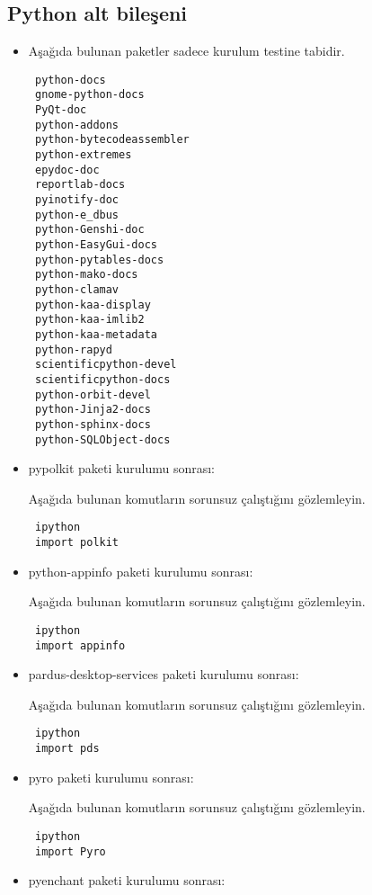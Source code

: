 \documentclass[a4paper,10pt]{article}
\begin{document}
\subsection{Python alt bileşeni}
\begin{itemize}

\item Aşağıda bulunan paketler sadece kurulum testine tabidir.
\begin{verbatim}
 python-docs
 gnome-python-docs
 PyQt-doc
 python-addons
 python-bytecodeassembler
 python-extremes
 epydoc-doc
 reportlab-docs
 pyinotify-doc 
 python-e_dbus
 python-Genshi-doc
 python-EasyGui-docs
 python-pytables-docs
 python-mako-docs
 python-clamav
 python-kaa-display
 python-kaa-imlib2
 python-kaa-metadata
 python-rapyd 
 scientificpython-devel
 scientificpython-docs
 python-orbit-devel
 python-Jinja2-docs
 python-sphinx-docs
 python-SQLObject-docs
\end{verbatim}
\item pypolkit paketi kurulumu sonrası:

Aşağıda bulunan komutların sorunsuz çalıştığını gözlemleyin.

\begin{verbatim}
 ipython
 import polkit
\end{verbatim}


\item python-appinfo paketi kurulumu sonrası:

Aşağıda bulunan komutların sorunsuz çalıştığını gözlemleyin.

\begin{verbatim}
 ipython
 import appinfo
\end{verbatim}

\item pardus-desktop-services paketi kurulumu sonrası:

Aşağıda bulunan komutların sorunsuz çalıştığını gözlemleyin.

\begin{verbatim}
 ipython
 import pds
\end{verbatim}

\item pyro paketi kurulumu sonrası:

Aşağıda bulunan komutların sorunsuz çalıştığını gözlemleyin.

\begin{verbatim}
 ipython
 import Pyro
\end{verbatim}

\item pyenchant paketi kurulumu sonrası:


\end{itemize}
\end{document}
